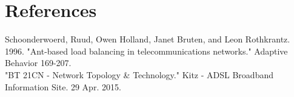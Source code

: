 \section*{References}
\label{sec:bib}

Schoonderwoerd, Ruud, Owen Holland, Janet Bruten, and Leon Rothkrantz. 1996. "Ant-based load balancing in telecommunications networks." Adaptive Behavior 169-207.\\

\noindent "BT 21CN - Network Topology \& Technology." Kitz - ADSL Broadband Information Site. 29 Apr. 2015.